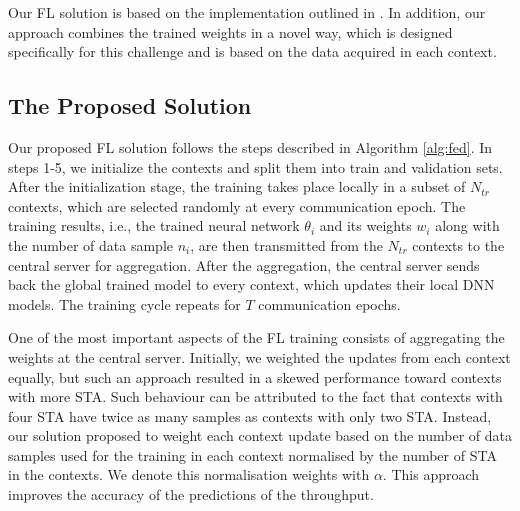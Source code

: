 Our \ac{FL} solution is based on the implementation outlined in \cite{federated_repo}. 
In addition, our approach combines the trained weights in a novel way, which is designed specifically for this challenge and is based on the data acquired in each context. 

\subsection{The Proposed Solution}

Our proposed \ac{FL} solution follows the steps described in Algorithm \ref{alg:fed}. 
In steps 1-5, we initialize the contexts and split them into train and validation sets. 
After the initialization stage, the training takes place locally in a subset of $N_{tr}$ contexts, which are selected randomly at every communication epoch. 
The training results, i.e., the trained neural network $\theta_i$ and its weights $w_i$ along with the number of data sample $n_i$, are then transmitted from the $N_{tr}$ contexts to the central server for aggregation. 
After the aggregation, the central server sends back the global trained model to every context, which updates their local \ac{DNN} models. 
The training cycle repeats for $T$ communication epochs. 

One of the most important aspects of the \ac{FL} training consists of aggregating the weights at the central server. 
Initially, we weighted the updates from each context equally, but such an approach resulted in a skewed performance toward contexts with more \ac{STA}. Such behaviour can be attributed to the fact that contexts with four \ac{STA} have twice as many samples as contexts with only two \ac{STA}. 
Instead, our solution proposed to weight each context update based on the number of data samples used for the training in each context normalised by the number of \ac{STA} in the contexts. We denote this normalisation weights with $\alpha$. This approach improves the accuracy of the predictions of the throughput. 

